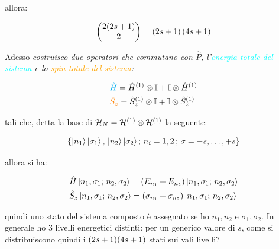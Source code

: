 	allora:

\begin{align*}
	 \mqty(2\qty(2s + 1) \\ 2)  = \qty(2s + 1)\, \qty(4s + 1)
\end{align*}

	Adesso \textit{costruisco due operatori che commutano con $\hat{P}$, l'\textcolor{cyan}{energia totale del sistema} e lo \textcolor{orange}{spin totale del sistema}:}
	
\begin{align*}
	& \textcolor{cyan}{\hat{H} } = \hat{H}^{\qty(1)} \otimes \mathbb{I} + \mathbb{I} \otimes \hat{H}^{\qty(1)} \\
	& \textcolor{orange}{ \hat{S}_z }= \hat{S}_z^{\qty(1)} \otimes \mathbb{I} + \mathbb{I} \otimes \hat{S}_z^{\qty(1)}
\end{align*}

	tali che, detta la base di $\mathcal{H}_N = \mathcal{H}^{\qty(1)} \otimes \mathcal{H}^{\qty(1)}$ la seguente:
	
\begin{align*}
	\qty{ \ket{n_1}\ket{\sigma_1}, \, \ket{n_2} \ket{\sigma_2} ; \, n_i = 1, 2 \, ;  \, \sigma = -s, \ldots, + s  }
\end{align*}

	allora si ha:
	
\begin{align*}
	& \hat{H}\ket{n_1, \sigma_1; \, n_2, \sigma_2} = \qty(E_{n_1} + E_{n_2}) \ket{n_1, \sigma_1; \, n_2, \sigma_2} \\
	& \hat{S}_z\ket{n_1, \sigma_1; \, n_2, \sigma_2} = \qty(\sigma_{n_1} + \sigma_{n_2}) \ket{n_1, \sigma_1; \, n_2, \sigma_2}
\end{align*}

	quindi uno stato del sistema composto è assegnato se ho $n_1, n_2$ e $\sigma_1, \sigma_2$. In generale ho $3$ livelli energetici distinti: per un generico valore di $s$, come si distribuiscono quindi i $\qty(2s + 1) \qty(4s + 1)$ stati sui vali livelli?


